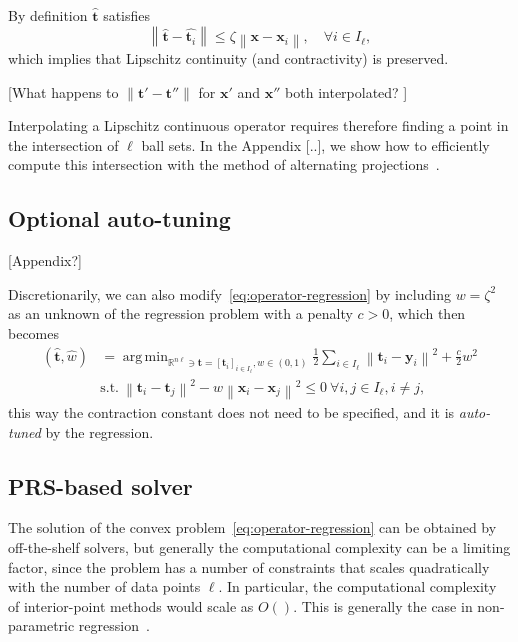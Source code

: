 \documentclass{article}
\DeclareMathOperator*{\argmin}{arg\,min}
\newcommand{\norm}[1]{\left\lVert#1\right\rVert}
\newcommand{\R}{\mathbb{R}}
\newcommand{\tv}{\mathbold{t}}
\newcommand{\x}{\mathbold{x}}
\newcommand{\y}{\mathbold{y}}
\newcommand{\andrea}[1]{{\color{red}[#1]}}
\begin{document}
By definition $\hat{\tv}$ satisfies
\begin{equation}
	\norm{\hat{\tv} - \hat{\tv_i}} \leq \zeta \norm{\x - \x_i}, \quad \forall i \in I_{\ell},
\end{equation}
which implies that Lipschitz continuity (and contractivity) is preserved.

\andrea{What happens to $\|\tv' - \tv''\|$ for $\x'$ and $\x''$ both interpolated? }


Interpolating a Lipschitz continuous operator requires therefore finding a point in the intersection of $\ell$ ball sets. In the Appendix [..], we show how to efficiently compute this intersection with the method of alternating projections~\cite{reich_projection_2015}.


\subsection{Optional auto-tuning }

\andrea{Appendix?}

Discretionarily, we can also modify~\eqref{eq:operator-regression} by including $w = \zeta^2$ as an unknown of the regression problem with a penalty $c>0$, which then becomes
\begin{equation}
\begin{split}
	(\hat{\tv}, \hat{w}) &= \argmin_{ \R^{n\ell} \ni \tv = [\tv_i]_{i \in I_{\ell}}, w \in (0,1)} \frac{1}{2} \sum_{i \in I_{\ell}} \norm{\tv_i - \y_i}^2 + \frac{c}{2} w^2 \\
	&\text{s.t.} \ \norm{\tv_i - \tv_j}^2 - w \norm{\x_i - \x_j}^2 \leq 0 \ \forall i,j \in I_{\ell}, i \neq j,
\end{split}
\end{equation}
this way the contraction constant does not need to be specified, and it is \emph{auto-tuned} by the regression.

\subsection{PRS-based solver}

The solution of the convex problem~\eqref{eq:operator-regression} can be obtained by off-the-shelf solvers, but generally the computational complexity can be a limiting factor, since the problem has a number of constraints that scales quadratically with the number of data points $\ell$. In particular, the computational complexity of interior-point methods would scale as $O()$. This is generally the case in non-parametric regression~\cite{.}. 
\end{document}
